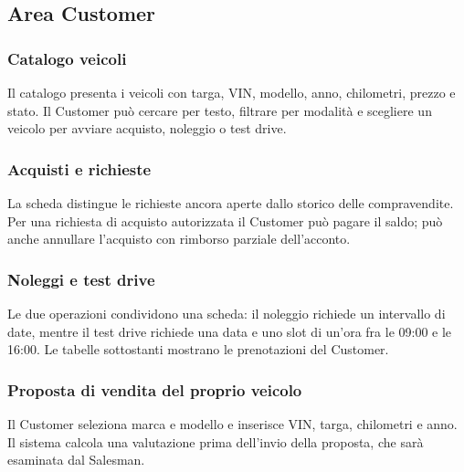 \subsection{Area Customer}

\noindent\begin{minipage}{\linewidth}
\subsubsection{Catalogo veicoli}
Il catalogo presenta i veicoli con targa, VIN, modello, anno, chilometri, prezzo e stato. Il Customer può cercare per testo, filtrare per modalità e scegliere un veicolo per avviare acquisto, noleggio o test drive.
\end{minipage}
\clearpage
\noindent\begin{minipage}{\linewidth}
\subsubsection{Acquisti e richieste}
La scheda distingue le richieste ancora aperte dallo storico delle compravendite. Per una richiesta di acquisto autorizzata il Customer può pagare il saldo; può anche annullare l'acquisto con rimborso parziale dell'acconto.
\end{minipage}
\par\medskip
\noindent\begin{minipage}{\linewidth}
\subsubsection{Noleggi e test drive}
Le due operazioni condividono una scheda: il noleggio richiede un intervallo di date, mentre il test drive richiede una data e uno slot di un'ora fra le 09:00 e le 16:00. Le tabelle sottostanti mostrano le prenotazioni del Customer.
\end{minipage}
\clearpage
\noindent\begin{minipage}{\linewidth}
\subsubsection{Proposta di vendita del proprio veicolo}
Il Customer seleziona marca e modello e inserisce VIN, targa, chilometri e anno. Il sistema calcola una valutazione prima dell'invio della proposta, che sarà esaminata dal Salesman.
\end{minipage}
